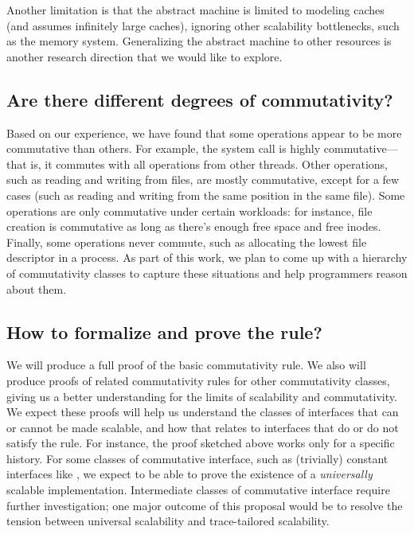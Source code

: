 Another limitation is that the abstract machine is limited to modeling
caches (and assumes infinitely large caches), ignoring other scalability
bottlenecks, such as the memory system.  Generalizing the abstract
machine to other resources is another research direction that we would
like to explore.


\subsection{Are there different degrees of commutativity?}

Based on our experience, we have found that some operations appear to
be more commutative than others.  For example, the  system call
is highly commutative---that is, it commutes with all operations
from other threads.  Other operations, such as reading and writing from
files, are mostly commutative, except for a few cases (such as reading
and writing from the same position in the same file).  Some operations
are only commutative under certain workloads: for instance, file creation
is commutative as long as there's enough free space and free inodes.
Finally, some operations never commute, such as allocating the lowest
file descriptor in a process.  As part of this work, we plan to come up
with a hierarchy of commutativity classes to capture these situations
and help programmers reason about them.


\subsection{How to formalize and prove the rule?}

We will produce a full proof of the basic commutativity rule.
%
We also will produce proofs of related commutativity rules for other
commutativity classes, giving us a better understanding for the
limits of scalability and commutativity.  We expect these proofs
will help us understand the classes of interfaces that can or cannot
be made scalable, and how that relates to interfaces that do or do not
satisfy the rule.
%
For instance, the proof sketched above works only for a specific history.
%
For some classes of commutative interface, such as (trivially)
constant interfaces like , we expect to be able to
prove the existence of a \emph{universally} scalable implementation.
%
Intermediate classes of commutative interface require further
investigation; one major outcome of this proposal would be to resolve
the tension between universal scalability and trace-tailored scalability.


